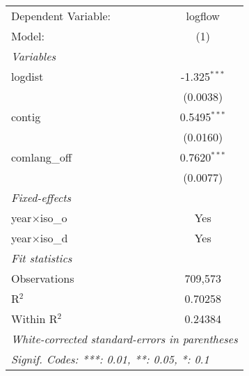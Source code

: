 \begin{tabular}{lc}
\tabularnewline\toprule\toprule
Dependent Variable:&logflow\\
Model:&(1)\\
\midrule
\emph{Variables}&  \\
logdist&-1.325$^{***}$\\
  &(0.0038)\\
contig&0.5495$^{***}$\\
  &(0.0160)\\
comlang\_off&0.7620$^{***}$\\
  &(0.0077)\\
\midrule
\emph{Fixed-effects}&  \\
year$\times$iso\_o&Yes\\
year$\times$iso\_d&Yes\\
\midrule
\emph{Fit statistics}&  \\
Observations& 709,573\\
R$^2$ & 0.70258\\
Within R$^2$ & 0.24384\\
\bottomrule\bottomrule
\multicolumn{2}{l}{\emph{White-corrected standard-errors in parentheses}}\\
\multicolumn{2}{l}{\emph{Signif. Codes: ***: 0.01, **: 0.05, *: 0.1}}\\
\end{tabular}
